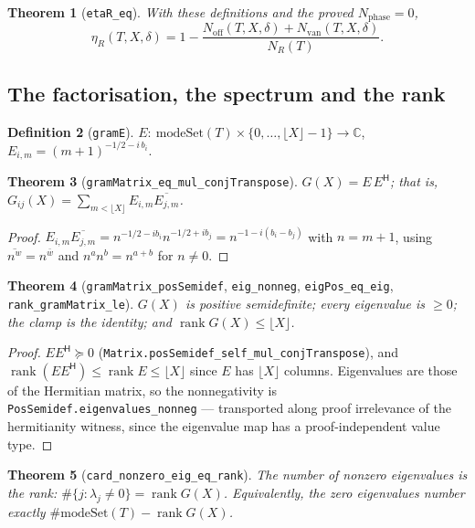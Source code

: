 \documentclass[11pt,a4paper]{article}
\newcommand{\C}{\mathbb{C}}
\newcommand{\lb}{\_\allowbreak}
\newcommand{\code}[1]{\texttt{#1}}
\newtheorem{theorem}{Theorem}[section]
\theoremstyle{definition}
\newtheorem{definition}[theorem]{Definition}
\theoremstyle{remark}
\begin{document}
\begin{theorem}[\code{etaR\lb eq}]
With these definitions and the proved $N_{\mathrm{phase}}=0$,
\[
  \eta_R(T,X,\delta)=1-\frac{N_{\mathrm{off}}(T,X,\delta)+N_{\mathrm{van}}(T,X,\delta)}{N_R(T)} .
\]
\end{theorem}

\subsection{The factorisation, the spectrum and the rank}\label{sec:eigen-factor}

\begin{definition}[\code{gramE}]
$E:\ \mathrm{modeSet}(T)\times\{0,\dots,\lfloor X\rfloor-1\}\to\C$, \quad
$E_{i,m}=(m+1)^{-1/2-i\,b_i}$.
\end{definition}

\begin{theorem}[\code{gramMatrix\lb eq\lb mul\lb conjTranspose}]\label{thm:EEH}
$G(X)=E\,E^{\mathsf H}$; that is, $G_{ij}(X)=\sum_{m<\lfloor X\rfloor}E_{i,m}\overline{E_{j,m}}$.
\end{theorem}
\begin{proof}
$E_{i,m}\overline{E_{j,m}}=n^{-1/2-ib_i}n^{-1/2+ib_j}=n^{-1-i(b_i-b_j)}$ with $n=m+1$, using
$\overline{n^{w}}=n^{\bar w}$ and $n^{a}n^{b}=n^{a+b}$ for $n\ne0$.
\end{proof}

\begin{theorem}[\code{gramMatrix\lb posSemidef}, \code{eig\lb nonneg}, \code{eigPos\lb eq\lb eig},
\code{rank\lb gramMatrix\lb le}]\label{thm:posSemidef}
$G(X)$ is positive semidefinite; every eigenvalue is $\ge0$; the clamp is the identity; and
$\operatorname{rank}G(X)\le\lfloor X\rfloor$.
\end{theorem}
\begin{proof}
$EE^{\mathsf H}\succeq0$ (\code{Matrix.posSemidef\lb self\lb mul\lb conjTranspose}), and
$\operatorname{rank}(EE^{\mathsf H})\le\operatorname{rank}E\le\lfloor X\rfloor$ since $E$ has
$\lfloor X\rfloor$ columns.  Eigenvalues are those of the Hermitian matrix, so the
nonnegativity is \code{PosSemidef.eigenvalues\lb nonneg} --- transported along proof
irrelevance of the hermitianity witness, since the eigenvalue map has a proof-independent
value type.
\end{proof}

\begin{theorem}[\code{card\lb nonzero\lb eig\lb eq\lb rank}]
The number of nonzero eigenvalues is the rank: $\#\{j:\lambda_j\ne0\}=\operatorname{rank}G(X)$.
Equivalently, the zero eigenvalues number exactly $\#\mathrm{modeSet}(T)-\operatorname{rank}G(X)$.
\end{theorem}
\end{document}
